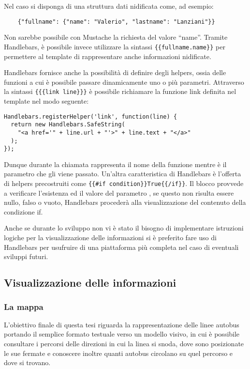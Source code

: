 Nel caso si disponga di una struttura dati nidificata come, ad esempio:
\begin{lstlisting}
    {"fullname": {"name": "Valerio", "lastname": "Lanziani"}}
\end{lstlisting}
Non sarebbe possibile con Mustache la richiesta del valore ``name''. Tramite Handlebars, è possibile invece utilizzare la sintassi \lstinline!{{fullname.name}}! per permettere al template di rappresentare anche informazioni nidificate.

Handlebars fornisce anche la possibilità di definire degli helpers, ossia delle funzioni a cui è possibile passare dinamicamente uno o più parametri. Attraverso la sintassi \lstinline!{{{link line}}}! è possibile richiamare la funzione link definita nel template nel modo seguente:
\begin{lstlisting}
Handlebars.registerHelper('link', function(line) {
  return new Handlebars.SafeString(
    "<a href='" + line.url + "'>" + line.text + "</a>"
  );
});
\end{lstlisting}
Dunque durante la chiamata  rappresenta il nome della funzione mentre  è il parametro che gli viene passato.
Un'altra caratteristica di Handlebars è l'offerta di helpers precostruiti come \lstinline!{{#if condition}}True{{/if}}!. Il blocco provvede a verificare l'esistenza ed il valore del parametro , se questo non risulta essere nullo, falso o vuoto, Handlebars procederà alla visualizzazione del contenuto della condizione if.

Anche se durante lo sviluppo non vi è stato il bisogno di implementare istruzioni logiche per la visualizzazione delle informazioni si è preferito fare uso di Handlebars per usufruire di una piattaforma più completa nel caso di eventuali sviluppi futuri.


\subsection{Visualizzazione delle informazioni} %
\label{sub:visualizzazione_delle_informazioni}

\subsubsection{La mappa} %
\label{ssub:la_mappa}

L'obiettivo finale di questa tesi riguarda la rappresentazione delle linee autobus portando il semplice formato testuale verso un modello visivo, in cui è possibile consultare i percorsi delle direzioni in cui la linea si snoda, dove sono posizionate le sue fermate e conoscere inoltre quanti autobus circolano su quel percorso e dove si trovano.

